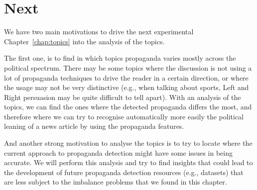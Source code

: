 \section{\statusgreen Next}
\label{sec:ps_next}

We have two main motivations to drive the next experimental Chapter~\ref{chap:topics} into the analysis of the topics.

The first one, is to find in which topics propaganda varies mostly across the political spectrum. There may be some topics where the discussion is not using a lot of propaganda techniques to drive the reader in a certain direction, or where the usage may not be very distinctive (e.g., when talking about sports, Left and Right persuasion may be quite difficult to tell apart).
With an analysis of the topics, we can find the ones where the detected propaganda differs the most, and therefore where we can try to recognise automatically more easily the political leaning of a news article by using the propaganda features.

And another strong motivation to analyse the topics is to try to locate where the current approach to propaganda detection might have some issues in being accurate.
We will perform this analysis and try to find insights that could lead to the development of future propaganda detection resources (e.g., datasets) that are less subject to the imbalance problems that we found in this chapter.


